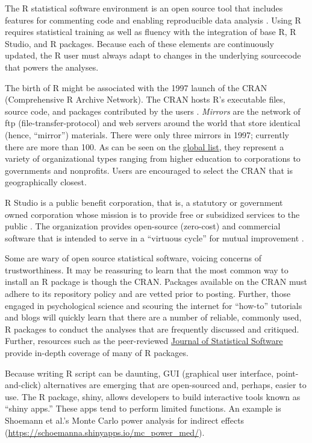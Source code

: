 \documentclass[
  11pt,
]{book}
\begin{document}
The R statistical software environment is an open source tool that includes features for commenting code and enabling reproducible data analysis \citep{alter_responsible_2018, bezjak_open_2018}. Using R requires statistical training as well as fluency with the integration of base R, R Studio, and R packages. Because each of these elements are continuously updated, the R user must always adapt to changes in the underlying sourcecode that powers the analyses.

The birth of R might be associated with the 1997 launch of the CRAN (Comprehensive R Archive Network). The CRAN hosts R's executable files, source code, and packages contributed by the users \citep{noauthor_r_2022}. \emph{Mirrors} are the network of ftp (file-transfer-protocol) and web servers around the world that store identical (hence, ``mirror'') materials. There were only three mirrors in 1997; currently there are more than 100. As can be seen on the \href{https://cran.r-project.org/}{global list}, they represent a variety of organizational types ranging from higher education to corporations to governments and nonprofits. Users are encouraged to select the CRAN that is geographically closest.

R Studio is a public benefit corporation, that is, a statutory or government owned corporation whose mission is to provide free or subsidized services to the public \citep{noauthor_rstudio_2022}. The organization provides open-source (zero-cost) and commercial software that is intended to serve in a ``virtuous cycle'' for mutual improvement \citep{noauthor_rstudio_2022}.

Some are wary of open source statistical software, voicing concerns of trustworthiness. It may be reassuring to learn that the most common way to install an R package is though the CRAN. Packages available on the CRAN must adhere to its repository policy and are vetted prior to posting. Further, those engaged in psychological science and scouring the internet for ``how-to'' tutorials and blogs will quickly learn that there are a number of reliable, commonly used, R packages to conduct the analyses that are frequently discussed and critiqued. Further, resources such as the peer-reviewed \href{https://www.jstatsoft.org/index}{Journal of Statistical Software} provide in-depth coverage of many of R packages.

Because writing R script can be daunting, GUI (graphical user interface, point-and-click) alternatives are emerging that are open-sourced and, perhaps, easier to use. The R package, shiny, allows developers to build interactive tools known as ``shiny apps.'' These apps tend to perform limited functions. An example is Shoemann et al.'s \citeyearpar{shoemann_determining_2017} Monte Carlo power analysis for indirect effects (\url{https://schoemanna.shinyapps.io/mc_power_med/}).
\end{document}
